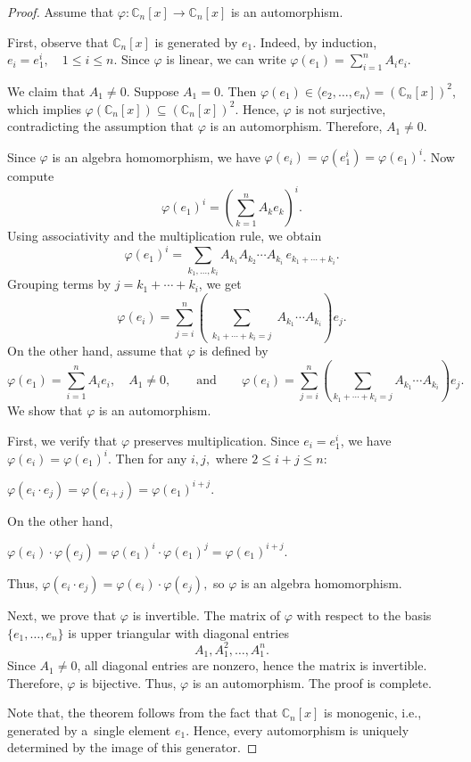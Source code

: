 \documentclass[10pt,a4paper]{amsart}
\begin{document}
	\begin{proof}
		Assume that $\varphi: \mathbb{C}_n [x] \to \mathbb{C}_n [x]$ is an automorphism.

		First, observe that $\mathbb{C}_n [x]$ is generated by $e_1$. Indeed, by induction,
		$e_i = e_1^i, \quad 1 \le i \le n.$
		Since $\varphi$ is linear, we can write
		$\varphi(e_1 ) = \sum_{i=1}^n A_i e_i.$

		We claim that $A_1 \ne 0$. Suppose $A_1 = 0$. Then $\varphi(e_1 ) \in \langle e_2, \dots, e_n \rangle = (\mathbb{C}_n [x])^2$, which implies
		$\varphi(\mathbb{C}_n [x]) \subseteq (\mathbb{C}_n [x])^2.$
		Hence, $\varphi$ is not surjective, contradicting the assumption that $\varphi$ is an automorphism. Therefore, $A_1 \ne 0$.

		Since $\varphi$ is an algebra homomorphism, we have
		$\varphi(e_i ) = \varphi(e_1^i ) = \varphi(e_1 )^i.$
		Now compute
		\[
			\varphi(e_1 )^i = \left( \sum_{k=1}^n A_k e_k \right)^i.
		\]
		Using associativity and the multiplication rule, we obtain
		\[
			\varphi(e_1 )^i =
			\sum_{k_1,\dots,k_i}
			A_{k_1} A_{k_2} \cdots A_{k_i} \, e_{k_1 +\cdots+k_i}.
		\]
		Grouping terms by $j = k_1 + \cdots + k_i$, we get
		\[
			\varphi(e_i )
			=
			\sum_{j=i}^n
			\left(
			\sum_{\substack{k_1 +\cdots+k_i =j}}
			A_{k_1} \cdots A_{k_i}
			\right)
			e_j.
		\]
		On the other hand, assume that $\varphi$ is defined by
		\[
			\varphi(e_1 ) = \sum_{i=1}^n A_i e_i, \quad A_1 \ne 0, \qquad \text{and} \qquad
			\varphi(e_i ) = \sum_{j=i}^n \left( \sum_{k_1 +\cdots+k_i =j} A_{k_1} \cdots A_{k_i} \right) e_j.
		\]
		We show that $\varphi$ is an automorphism.

		First, we verify that $\varphi$ preserves multiplication. Since $e_i = e_1^i$, we have
		$\varphi(e_i ) = \varphi(e_1 )^i.$
		Then for any $i,j,$ where $2 \le i+j \le n:$
		\begin{center}
			$\varphi(e_i\cdot e_j )
			=
			\varphi(e_{i+j})
			=
			\varphi(e_1 )^{i+j}.$
		\end{center}
		On the other hand,
		\begin{center}
			$\varphi(e_i )\cdot \varphi(e_j )
			=
			\varphi(e_1 )^i \cdot \varphi(e_1 )^j
			=
			\varphi(e_1 )^{i+j}.$
		\end{center}
		Thus,
		$\varphi(e_i\cdot e_j ) = \varphi(e_i )\cdot \varphi(e_j ),$
		so $\varphi$ is an algebra homomorphism.

		Next, we prove that $\varphi$ is invertible. The matrix of $\varphi$ with respect to the basis $\{e_1, \dots, e_n\}$ is upper triangular with diagonal entries
		\[
			A_1, A_1^2, \dots, A_1^n.
		\]
		Since $A_1 \ne 0$, all diagonal entries are nonzero, hence the matrix is invertible. Therefore, $\varphi$ is bijective. Thus, $\varphi$ is an automorphism. The proof is complete.

		Note that, the theorem follows from the fact that $\mathbb{C}_n [x]$ is monogenic, i.e., generated by a~single element $e_1$. Hence, every automorphism is uniquely determined by the image of this generator.
	\end{proof}
\end{document}
